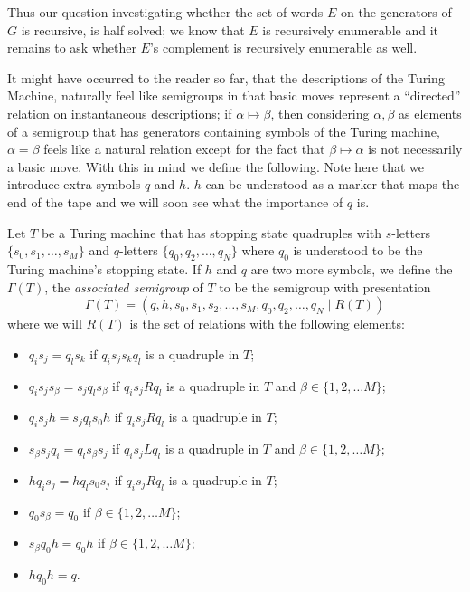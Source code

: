 Thus our question investigating whether the set of words $E$ on the generators of $G$ is recursive, is half solved; we know that $E$ is recursively enumerable and it remains to ask whether $E$'s complement is recursively enumerable as well.

It might have occurred to the reader so far, that the descriptions of the Turing Machine, naturally feel like semigroups in that basic moves represent a ``directed'' relation on instantaneous descriptions; if $\alpha \mapsto \beta$, then considering $\alpha,\beta$ as elements of a semigroup that has generators containing symbols of the Turing machine, $\alpha = \beta$ feels like a natural relation except for the fact that $\beta \mapsto \alpha$ is not necessarily a basic move. With this in mind we define the following. Note here that we introduce extra symbols $q$ and $h$. $h$ can be understood as a marker that maps the end of the tape and we will soon see what the importance of $q$ is.

\begin{definition}
  \label{associated-semigroup}
  Let $T$ be a Turing machine that has stopping state quadruples with $s$-letters $\{s_0,s_1,\dots,s_M\}$ and $q$-letters $\{q_0,q_2,\dots,q_N\}$ where $q_0$ is understood to be the Turing machine's stopping state. If $h$ and $q$ are two more symbols, we define the $\Gamma(T)$, the \emph{associated semigroup} of $T$ to be the semigroup with presentation
  \begin{equation*}
    \Gamma(T) = (q,h,s_0,s_1,s_2, \dots, s_M, q_0,q_2, \dots, q_N \mid R(T))
  \end{equation*}
  where we will $R(T)$ is the set of relations with the following elements:
  \begin{itemize}
  \item  $q_is_j = q_ls_k$ if  $q_is_js_kq_l$ is a quadruple in $T$;
  \item $q_is_js_\beta = s_jq_ls_\beta$ if $q_is_jRq_l$ is a quadruple in $T$ and $\beta \in \{1,2,\dots M\}$;
  \item $q_is_jh = s_jq_ls_0h$ if $q_is_jRq_l$ is a quadruple in $T$;
  \item $s_\beta s_jq_i = q_ls_\beta s_j$ if $q_is_jLq_l$ is a quadruple in $T$ and $\beta \in \{1,2,\dots M\}$;
  \item $hq_is_j = h q_ls_0s_j$ if $q_is_jRq_l$ is a quadruple in $T$;
  \item $q_0s_\beta = q_0$ if $\beta \in \{1,2,\dots M\}$;
  \item $s_\beta q_0 h = q_0h$ if $\beta \in \{1,2,\dots M\}$;
  \item $hq_0h = q$.
  \end{itemize}
\end{definition}

